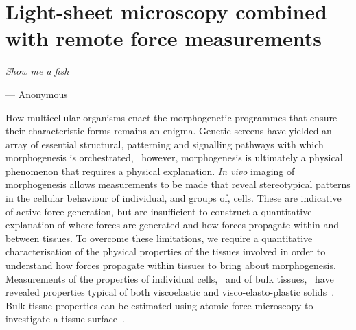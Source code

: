 
\ifpdf
    \graphicspath{{Chapters/tweezers/Figs/Raster/}{Chapters/tweezers/Figs/PDF/}{Chapters/tweezers/Figs/}}
\else
    \graphicspath{{Chapters/tweezers/Figs/Vector/}{Chapters/tweezers/Figs/}}
\fi

\chapter[Light-sheet microscopy combined with remote force measurements]{Light-sheet microscopy combined with remote force measurements}\label{chapter:tweezers}
\epigraph{\emph{Show me a fish}}{--- Anonymous}
How multicellular organisms enact the morphogenetic programmes that ensure their characteristic forms remains an enigma.
Genetic screens have yielded an array of essential structural, patterning and signalling pathways with which morphogenesis is orchestrated,~\cite{gilbertDevelopmentalBiology2000} however, morphogenesis is ultimately a physical phenomenon that requires a physical explanation.
\emph{In vivo} imaging of morphogenesis allows measurements to be made that reveal stereotypical patterns in the cellular behaviour of individual, and groups of, cells.
These are indicative of active force generation, but are insufficient to construct a quantitative explanation of where forces are generated and how forces propagate within and between tissues.
To overcome these limitations, we require a quantitative characterisation of the physical properties of the tissues involved in order to understand how forces propagate within tissues to bring about morphogenesis.
Measurements of the properties of individual cells,~\cite{1} and of bulk tissues,~\cite{2} have revealed properties typical of both viscoelastic and visco-elasto-plastic solids~\cite{3}.
Bulk tissue properties can be estimated using atomic force microscopy to investigate a tissue surface~\cite{18}.
